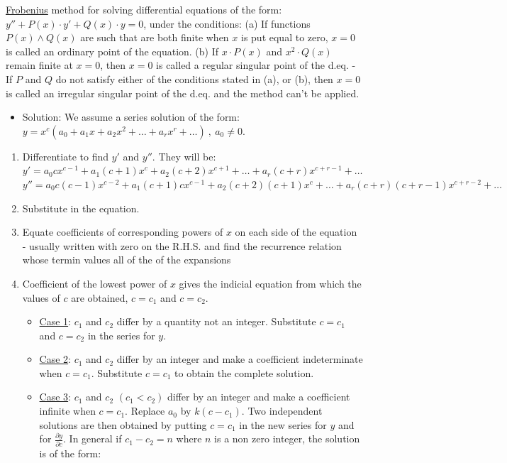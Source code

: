 \documentclass[12pt]{article}
\begin{document}
\begin{flushleft}
	\uline{Frobenius} method for solving differential equations of the form: $\displaystyle y'' +P(x)\cdot y' + Q(x) \cdot y = 0$, under the conditions: \linebreak 
	(a) If functions $P(x) \land Q(x)$ are such that are both finite when $x$ is put equal to zero, $x=0$ is called an ordinary point of the equation. \linebreak 
	(b) If $\displaystyle x\cdot P(x)$ and $x^2 \cdot Q(x)$ remain finite at $x=0$, then $x=0$ is called a regular singular point of the d.eq. \linebreak 
	- If $P$ and $Q$ do not satisfy either of the conditions stated in (a), or (b), then $x=0$ is called an irregular singular point of the d.eq. and the method can't be applied.  
	\begin{itemize}
	\renewcommand{\labelitemi}{$\rightarrow$}
	\item Solution: We assume a series solution of the form: $\displaystyle y=x^c(a_0 +a_1x+a_2x^2+\ldots+a_rx^r+\ldots)\ , \ a_0 \neq 0$.
	\end{itemize}
	\begin{enumerate}
	\item Differentiate to find $y'$ and $y''$. They will be: \linebreak 
	$\displaystyle y'= a_0 c x^{c-1} +a_1 (c+1)x^c +a_2 (c+2) x^{c+1} + \ldots + a_r(c+r) x^{c+r-1} + \ldots$  \linebreak 
	$\displaystyle y'' = a_0c(c-1)x^{c-2} + a_1(c+1) cx^{c-1} +a_2(c+2)(c+1)x^c + \ldots + a_r(c+r)(c+r-1) x^{c+r-2} +\ldots$ 
	\item Substitute in the equation. 
	\item Equate coefficients of corresponding powers of $x$ on each side of the equation - usually written with zero on the R.H.S. and find the recurrence relation whose termin values all of the of the expansions
	\item Coefficient of the lowest power of $x$ gives the indicial equation from which the values of $c$ are obtained, $c=c_1$ and $c=c_2$. 
	\begin{itemize}
	\item \uline{Case 1}: $c_1$ and $c_2$ differ by a quantity not an integer. \linebreak 
	Substitute $c=c_1$ and $c=c_2$ in the series for $y$. 
	\item \uline{Case 2}: $c_1$ and $c_2$ differ by an integer and make a coefficient indeterminate when $c=c_1$. Substitute $c=c_1$ to obtain the complete solution. 
	\item \uline{Case 3}: $c_1$ and $c_2$ $(c_1 < c_2)$ differ by an integer and make a coefficient infinite when $c=c_1$. Replace $a_0$ by $k(c-c_1)$. Two independent solutions are then obtained by putting $c=c_1$ in the new series for $y$ and for $\displaystyle \frac{\partial y}{\partial c}$. In general if $c_1-c_2 = n$ where $n$ is a non zero integer, the solution is of the form: \linebreak 

\end{itemize}
\end{enumerate}
\end{flushleft}
\end{document}
